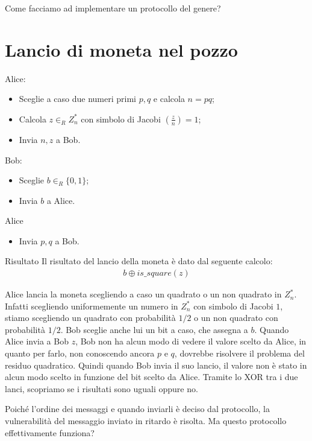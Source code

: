 \noindent Come facciamo ad implementare un protocollo del genere?

\section{Lancio di moneta nel pozzo}
Alice: 
\begin{itemize}
    \item Sceglie a caso due numeri primi $p, q$ e calcola $n=pq$; 
    \item Calcola $z \in_R Z_n^*$ con simbolo di Jacobi $\left( \frac{z}{n}\right)=1$;
    \item Invia $n, z$ a Bob.
\end{itemize}

\noindent Bob:
\begin{itemize}
    \item Sceglie $b \in_R \{0, 1\}$;
    \item Invia $b$ a Alice.
\end{itemize}

\noindent Alice 
\begin{itemize}
    \item Invia $p, q$ a Bob.
\end{itemize}

Risultato
Il risultato del lancio della moneta è dato dal seguente calcolo:
\begin{align*}
    b \oplus is\_square(z)
\end{align*}

\noindent Alice lancia la moneta scegliendo a caso un quadrato o un non quadrato in $Z_n^*$. Infatti scegliendo uniformemente un numero in $Z_n^*$ con simbolo di Jacobi $1$, stiamo scegliendo un quadrato con probabilità $1/2$ o un non quadrato con probabilità $1/2$. Bob sceglie anche lui un bit a caso, che assegna a $b$. 
Quando Alice invia a Bob $z$, Bob non ha alcun modo di vedere il valore scelto da Alice, in quanto per farlo, non conoscendo ancora $p$ e $q$, dovrebbe risolvere il problema del residuo quadratico. Quindi quando Bob invia il suo lancio, il valore non è stato in alcun modo scelto in funzione del bit scelto da Alice. Tramite lo XOR tra i due lanci, scopriamo se i risultati sono uguali oppure no.

Poiché l'ordine dei messaggi e quando inviarli è deciso dal protocollo, la vulnerabilità del messaggio inviato in ritardo è risolta. Ma questo protocollo effettivamente funziona?

